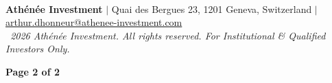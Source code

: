 \documentclass[10pt,a4paper]{article}
\begin{document}
\noindent{\color{cardborder}\rule{\textwidth}{0.6pt}}\\[2pt]
\noindent
\begin{minipage}[c]{0.74\textwidth}
    {\tiny \textcolor{mutedtext}{\textbf{Ath\'en\'ee Investment} $\vert$ Quai des Bergues 23, 1201 Geneva, Switzerland $\vert$ \href{mailto:arthur.dhonneur@athenee-investment.com}{arthur.dhonneur@athenee-investment.com}}\\[1pt]
    \tiny \textcolor{mutedtext}{\textit{\textcopyright\ 2026 Ath\'en\'ee Investment. All rights reserved. For Institutional \& Qualified Investors Only.}}}
\end{minipage}%
\hfill
\begin{minipage}[c]{0.24\textwidth}
    \raggedleft
    {\tiny \bfseries \textcolor{primary}{Page 2 of 2}}
\end{minipage}
\end{document}
